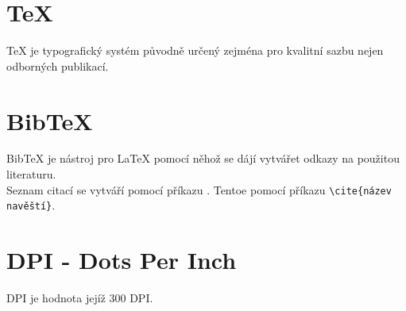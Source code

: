 \documentclass[a4paper, 11pt]{article}
\begin{document}
\section{\TeX}
\TeX \- je typografický systém původně určený zejména pro kvalitní sazbu  nejen odborných publikací.
\cite{dipl_martin_cerny}

\section{Bib\TeX}
Bib\TeX \- je nástroj pro \LaTeX \- pomocí něhož se dájí vytvářet odkazy na použitou literaturu.    \\
Seznam citací se vytváří pomocí příkazu \verb||. Tentoe pomocí příkazu \verb|\cite{název navěští}|.
\cite{dipl_michal_janda, bibtex_alex}

\section{DPI - Dots Per Inch}
DPI je hodnota jejíž  300 DPI.
\cite{computer_casopis, vsellis, repronis_foto}

\pagebreak
\newpage


\def\refname{Literatura}

\end{document}
